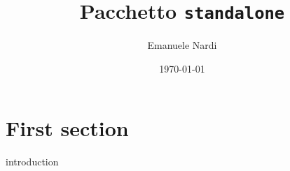 \documentclass{article}
\title{Pacchetto \texttt{standalone}}
\author{Emanuele Nardi}
\date{\today}
\begin{document}
	\maketitle

	\section{First section}
	{introduction}
\end{document}
